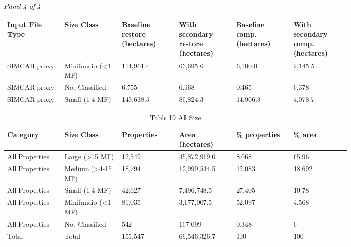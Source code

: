 \documentclass[12pt]{article}
\begin{document}
\begin{landscape}
\begin{table}[H]
\textit{Panel 4 of 4}\\[2pt]
{\fontsize{12}{14}\selectfont
\setlength{\tabcolsep}{3pt}
\renewcommand{\arraystretch}{1.08}
\begin{tabular}{p{0.137\linewidth}p{0.137\linewidth}p{0.137\linewidth}p{0.137\linewidth}p{0.137\linewidth}p{0.137\linewidth}}
\toprule
Input File Type & Size Class & Baseline restore (hectares) & With secondary restore (hectares) & Baseline comp. (hectares) & With secondary comp. (hectares) \\
\midrule
SIMCAR proxy & Minifundio (<1 MF) & 114,961.4 & 63,695.6 & 6,100.0 & 2,145.5 \\
SIMCAR proxy & Not Classified & 6.755 & 6.668 & 0.465 & 0.378 \\
SIMCAR proxy & Small (1-4 MF) & 149,638.3 & 80,824.3 & 14,906.8 & 4,078.7 \\
\bottomrule
\end{tabular}
}
\end{table}
\end{landscape}

\begin{table}[H]
\centering
\caption{Table 19 All Size}
{\fontsize{12}{14}\selectfont
\setlength{\tabcolsep}{3pt}
\renewcommand{\arraystretch}{1.08}
\begin{tabular}{p{0.137\linewidth}p{0.137\linewidth}p{0.137\linewidth}p{0.137\linewidth}p{0.137\linewidth}p{0.137\linewidth}}
\toprule
Category & Size Class & Properties & Area (hectares) & \% properties & \% area \\
\midrule
All Properties & Large (>15 MF) & 12,549 & 45,872,919.0 & 8.068 & 65.96 \\
All Properties & Medium (>4-15 MF) & 18,794 & 12,999,544.5 & 12.083 & 18.692 \\
All Properties & Small (1-4 MF) & 42,627 & 7,496,748.5 & 27.405 & 10.78 \\
All Properties & Minifundio (<1 MF) & 81,035 & 3,177,007.5 & 52.097 & 4.568 \\
All Properties & Not Classified & 542 & 107.099 & 0.348 & 0 \\
Total & Total & 155,547 & 69,546,326.7 & 100 & 100 \\
\bottomrule
\end{tabular}
}
\end{table}
\end{document}
